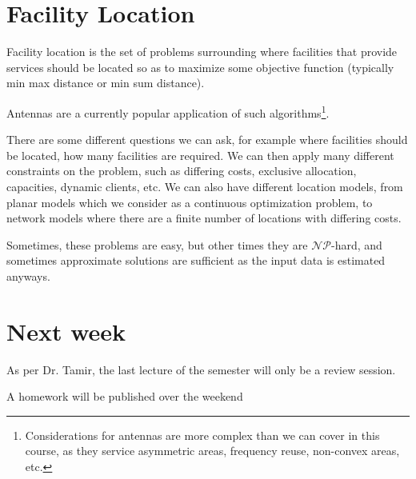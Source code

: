 \documentclass{idc_msc}
\newcommand{\NPclass}{\mathcal{NP}}
\begin{document}
\section{Facility Location}

Facility location is the set of problems surrounding where facilities that provide services should be located so as to maximize some objective function (typically min max distance or min sum distance).

Antennas are a currently popular application of such algorithms\footnote{Considerations for antennas are more complex than we can cover in this course, as they service asymmetric areas, frequency reuse, non-convex areas, etc.}.

There are some different questions we can ask, for example where facilities should be located, how many facilities are required.
We can then apply many different constraints on the problem, such as differing costs, exclusive allocation, capacities, dynamic clients, etc.
We can also have different location models, from planar models which we consider as a continuous optimization problem, to network models where there are a finite number of locations with differing costs.

Sometimes, these problems are easy, but other times they are \(\NPclass\)-hard, and sometimes approximate solutions are sufficient as the input data is estimated anyways.

\section{Next week}

As per Dr. Tamir, the last lecture of the semester will only be a review session.

A homework will be published over the weekend
\end{document}
